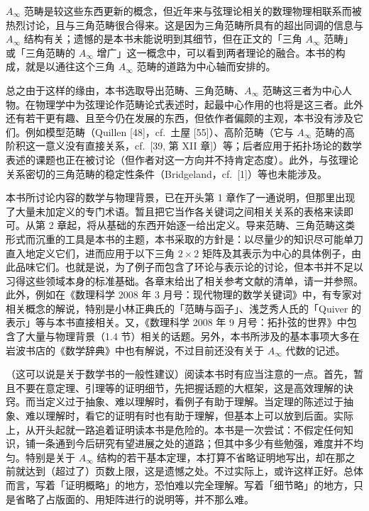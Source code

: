 $A_\infty$ 范畴是较这些东西更新的概念，但近年来与弦理论相关的数理物理相联系而被热烈讨论，且与三角范畴很合得来。这是因为三角范畴所具有的超出同调的信息与 $A_\infty$ 结构有关；遗憾的是本书未能说明到其细节，但在正文的「三角 $A_\infty$ 范畴」或「三角范畴的 $A_\infty$ 增广」这一概念中，可以看到两者理论的融合。本书的构成，就是以通往这个三角 $A_\infty$ 范畴的道路为中心轴而安排的。

总之由于这样的缘由，本书选取导出范畴、三角范畴、$A_\infty$ 范畴这三者为中心人物。在物理学中为弦理论作范畴论式表述时，起最中心作用的也将是这三者。此外还有若干更有趣、且至今仍在发展的东西，但依作者偏颇的主观，本书没有涉及它们。例如模型范畴（Quillen [48]，cf.\ 土屋 [55]）、高阶范畴（它与 $A_\infty$ 范畴的高阶积这一意义没有直接关系，cf.\ [39, 第 XII 章]）等；后者应用于拓扑场论的数学表述的课题也正在被讨论（但作者对这一方向并不持肯定态度）。此外，与弦理论关系密切的三角范畴的稳定性条件（Bridgeland，cf.\ [1]）等也未能涉及。

本书所讨论内容的数学与物理背景，已在开头第 1 章作了一通说明，但那里出现了大量未加定义的专门术语。暂且把它当作各关键词之间相关关系的表格来读即可。从第 2 章起，将从基础的东西开始逐一给出定义。导来范畴、三角范畴这类形式而沉重的工具是本书的主题，本书采取的方針是：以尽量少的知识尽可能单刀直入地定义它们，进而应用于以下三角 $2\times2$ 矩阵及其表示为中心的具体例子，由此品味它们。也就是说，为了例子而包含了环论与表示论的讨论，但本书并不足以习得这些领域本身的标准基础。各章末给出了相关参考文献的清单，请一并参照。此外，例如在《数理科学 2008 年 3 月号：现代物理的数学关键词》中，有专家对相关概念的解说，特别是小林正典氏的「范畴与函子」、浅芝秀人氏的「Quiver 的表示」等与本书直接相关。又，《数理科学 2008 年 9 月号：拓扑弦的世界》中包含了大量与物理背景（1.4 节）相关的话题。另外，本书所涉及的基本事项大多在岩波书店的《数学辞典》中也有解说，不过目前还没有关于 $A_\infty$ 代数的记述。

（这可以说是关于数学书的一般性建议）阅读本书时有应当注意的一点。首先，暂且不要在意定理、引理等的证明细节，先把握话题的大框架，这是高效理解的诀窍。而当定义过于抽象、难以理解时，看例子有助于理解。当定理的陈述过于抽象、难以理解时，看它的证明有时也有助于理解，但基本上可以放到后面。实际上，从开头起就一路追着证明读本书是危险的。本书是一次尝试：不假定任何知识，铺一条通到今后研究有望进展之处的道路；但其中多少有些勉强，难度并不均匀。特别是关于 $A_\infty$ 结构的若干基本定理，本打算不省略证明地写出，却在那之前就达到（超过了）页数上限，这是遗憾之处。不过实际上，或许这样正好。总体而言，写着「证明概略」的地方，恐怕难以完全理解。写着「细节略」的地方，只是省略了占版面的、用矩阵进行的说明等，并不那么难。

